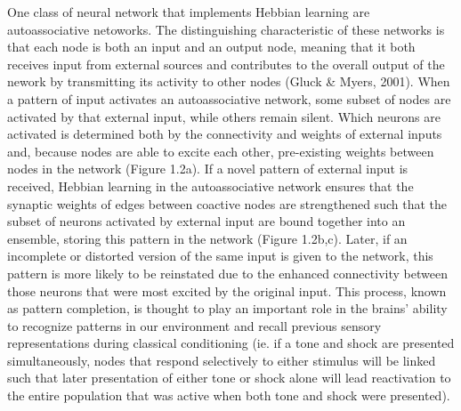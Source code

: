 \documentclass[12pt,a4paper,]{report}
\begin{document}
One class of neural network that implements Hebbian learning are
autoassociative netoworks. The distinguishing characteristic of these
networks is that each node is both an input and an output node, meaning
that it both receives input from external sources and contributes to the
overall output of the nework by transmitting its activity to other nodes
(Gluck \& Myers, 2001). When a pattern of input activates an
autoassociative network, some subset of nodes are activated by that
external input, while others remain silent. Which neurons are activated
is determined both by the connectivity and weights of external inputs
and, because nodes are able to excite each other, pre-existing weights
between nodes in the network (Figure 1.2a). If a novel pattern of
external input is received, Hebbian learning in the autoassociative
network ensures that the synaptic weights of edges between coactive
nodes are strengthened such that the subset of neurons activated by
external input are bound together into an ensemble, storing this pattern
in the network (Figure 1.2b,c). Later, if an incomplete or distorted
version of the same input is given to the network, this pattern is more
likely to be reinstated due to the enhanced connectivity between those
neurons that were most excited by the original input. This process,
known as pattern completion, is thought to play an important role in the
brains' ability to recognize patterns in our environment and recall
previous sensory representations during classical conditioning (ie. if a
tone and shock are presented simultaneously, nodes that respond
selectively to either stimulus will be linked such that later
presentation of either tone or shock alone will lead reactivation to the
entire population that was active when both tone and shock were
presented).
\end{document}
